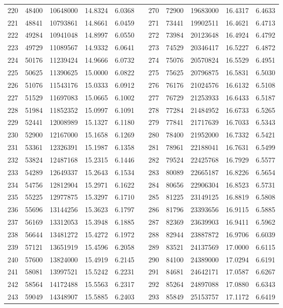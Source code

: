 \begin{longtable}{rrrrrrrrrrr}
220&48400&10648000&14.8324&6.0368&&270&72900&19683000&16.4317&6.4633\\
221&48841&10793861&14.8661&6.0459&&271&73441&19902511&16.4621&6.4713\\
222&49284&10941048&14.8997&6.0550&&272&73984&20123648&16.4924&6.4792\\
223&49729&11089567&14.9332&6.0641&&273&74529&20346417&16.5227&6.4872\\
224&50176&11239424&14.9666&6.0732&&274&75076&20570824&16.5529&6.4951\\
225&50625&11390625&15.0000&6.0822&&275&75625&20796875&16.5831&6.5030\\
226&51076&11543176&15.0333&6.0912&&276&76176&21024576&16.6132&6.5108\\
227&51529&11697083&15.0665&6.1002&&277&76729&21253933&16.6433&6.5187\\
228&51984&11852352&15.0997&6.1091&&278&77284&21484952&16.6733&6.5265\\
229&52441&12008989&15.1327&6.1180&&279&77841&21717639&16.7033&6.5343\\
230&52900&12167000&15.1658&6.1269&&280&78400&21952000&16.7332&6.5421\\
231&53361&12326391&15.1987&6.1358&&281&78961&22188041&16.7631&6.5499\\
232&53824&12487168&15.2315&6.1446&&282&79524&22425768&16.7929&6.5577\\
233&54289&12649337&15.2643&6.1534&&283&80089&22665187&16.8226&6.5654\\
234&54756&12812904&15.2971&6.1622&&284&80656&22906304&16.8523&6.5731\\
235&55225&12977875&15.3297&6.1710&&285&81225&23149125&16.8819&6.5808\\
236&55696&13144256&15.3623&6.1797&&286&81796&23393656&16.9115&6.5885\\
237&56169&13312053&15.3948&6.1885&&287&82369&23639903&16.9411&6.5962\\
238&56644&13481272&15.4272&6.1972&&288&82944&23887872&16.9706&6.6039\\
239&57121&13651919&15.4596&6.2058&&289&83521&24137569&17.0000&6.6115\\
240&57600&13824000&15.4919&6.2145&&290&84100&24389000&17.0294&6.6191\\
241&58081&13997521&15.5242&6.2231&&291&84681&24642171&17.0587&6.6267\\
242&58564&14172488&15.5563&6.2317&&292&85264&24897088&17.0880&6.6343\\
243&59049&14348907&15.5885&6.2403&&293&85849&25153757&17.1172&6.6419\\

\end{longtable}
